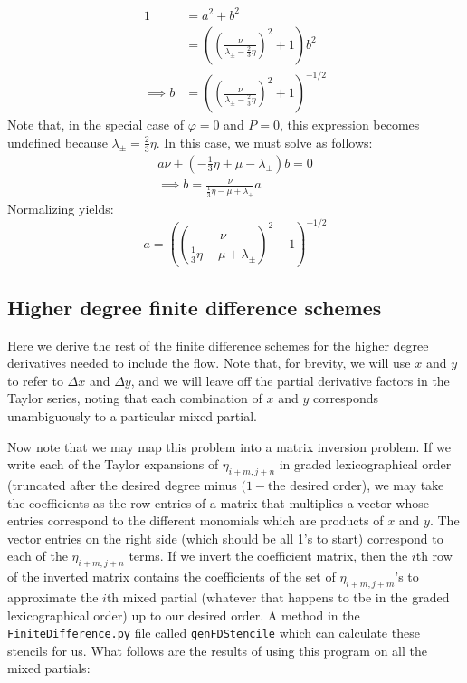 \documentclass[reqno]{article}
\begin{document}
	\begin{equation}
	\begin{split}
		1 &= a^2 + b^2 \\
		&= \left(\left( \frac{\nu}{\lambda_\pm - \tfrac23 \eta} \right)^2 + 1\right)b^2 \\
		\implies b &= \left(\left( \frac{\nu}{\lambda_\pm - \tfrac23 \eta} \right)^2 + 1\right)^{-1/2}
	\end{split}
	\end{equation}
	Note that, in the special case of $\varphi = 0$ and $P = 0$, this expression becomes undefined because $\lambda_\pm = \tfrac23\eta$. In this case, we must solve as follows:
	\begin{equation}
	\begin{split}
		a\nu + \left(-\tfrac13 \eta + \mu - \lambda_\pm\right)b = 0 \\
		\implies b = \frac{\nu}{\tfrac13 \eta - \mu + \lambda_\pm}a
	\end{split}
	\end{equation}
	Normalizing yields:
	\begin{equation}
		a = \left(\left( \frac{\nu}{\tfrac13 \eta - \mu + \lambda_\pm} \right)^2 + 1\right)^{-1/2}
	\end{equation}
	
	\subsection{Higher degree finite difference schemes}
	Here we derive the rest of the finite difference schemes for the higher degree derivatives needed to include the flow. Note that, for brevity, we will use $x$ and $y$ to refer to $\Delta x$ and $\Delta y$, and we will leave off the partial derivative factors in the Taylor series, noting that each combination of $x$ and $y$ corresponds unambiguously to a particular mixed partial. 
	
	Now note that we may map this problem into a matrix inversion problem. If we write each of the Taylor expansions of $\eta_{i + m, j + n}$ in graded lexicographical order (truncated after the desired degree minus $(1 - \text{the desired order}$), we may take the coefficients as the row entries of a matrix that multiplies a vector whose entries correspond to the different monomials which are products of $x$ and $y$. The vector entries on the right side (which should be all 1's to start) correspond to each of the $\eta_{i + m, j + n}$ terms. If we invert the coefficient matrix, then the $i$th row of the inverted matrix contains the coefficients of the set of $\eta_{i + m, j + m}$'s to approximate the $i$th mixed partial (whatever that happens to tbe in the graded lexicographical order) up to our desired order. A method in the \verb|FiniteDifference.py| file called \verb|genFDStencile| which can calculate these stencils for us. What follows are the results of using this program on all the mixed partials:
	
\end{document}
